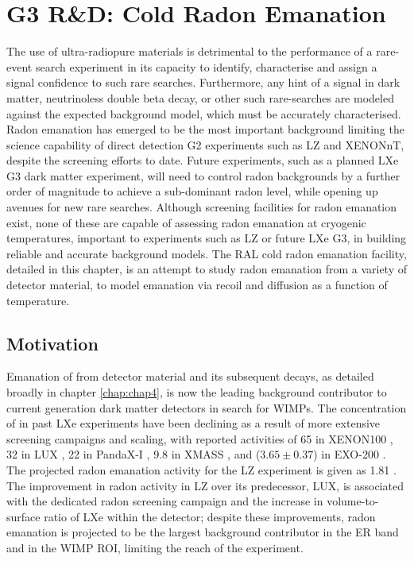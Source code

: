 \chapter{G3 R\&D: Cold Radon Emanation}
\label{chap:chap7}

The use of ultra-radiopure materials is detrimental to the performance of a rare-event search experiment in its capacity to identify, characterise and assign a signal confidence to such rare searches. Furthermore, any hint of a signal in dark matter, neutrinoless double beta decay, or other such rare-searches are modeled against the expected background model, which must be accurately characterised. Radon emanation has emerged to be the most important background limiting the science capability of direct detection G2 experiments such as LZ and XENONnT, despite the screening efforts to date. Future experiments, such as a planned LXe G3 dark matter experiment, will need to control radon backgrounds by a further order of magnitude to achieve a sub-dominant radon level, while opening up avenues for new rare searches. Although screening facilities for radon emanation exist, none of these are capable of assessing radon emanation at cryogenic temperatures, important to experiments such as LZ or future LXe G3, in building reliable and accurate background models. The RAL cold radon emanation facility, detailed in this chapter, is an attempt to study radon emanation from a variety of detector material, to model emanation via recoil and diffusion as a function of temperature.
 
 
\section{Motivation}
\label{sec:motivation_7}

Emanation of \RnTTT{} from detector material and its subsequent decays, as detailed broadly in chapter \ref{chap:chap4}, is now the leading background contributor to current generation dark matter detectors in search for WIMPs. The concentration of \RnTTT{} in past LXe experiments have been declining as a result of more extensive screening campaigns and scaling, with reported activities of 65 \uBqkg{} in XENON100 \cite{Aprile:2012nq}, 32 \uBqkg{} in LUX \cite{Akerib:2013tjd}, 22 \uBqkg{} in PandaX-I \cite{Xiao:2014xyn}, 9.8 \uBqkg{} in XMASS \cite{Abe:2013tc}, and ($3.65\pm0.37$) \uBqkg{} in EXO-200 \cite{Albert:2015nta}. The projected radon emanation activity for the LZ experiment is given as 1.81 \uBqkg{}. The improvement in radon activity in LZ over its predecessor, LUX, is associated with the dedicated radon screening campaign \cite{lz_screening} and the increase in volume-to-surface ratio of LXe within the detector; despite these improvements, radon emanation is projected to be the largest background contributor in the ER band and in the WIMP ROI, limiting the reach of the experiment. 

